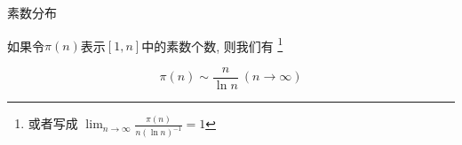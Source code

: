 \begin{frame}[fragile]{素数分布}
	\begin{theorem}
		\label{prime:th:prime-distributation}

		如果令\(\pi(n)\)表示\([1,n]\)中的素数个数, 则我们有
		\footnote{或者写成 \(\displaystyle\lim_{n\to\infty}\frac{\pi(n)}{n (\ln n)^{-1}}=1\)}

		\begin{equation}
			\pi(n)\sim\frac{n}{\ln n}~(n\to\infty)
		\end{equation}
	\end{theorem}
\end{frame}
